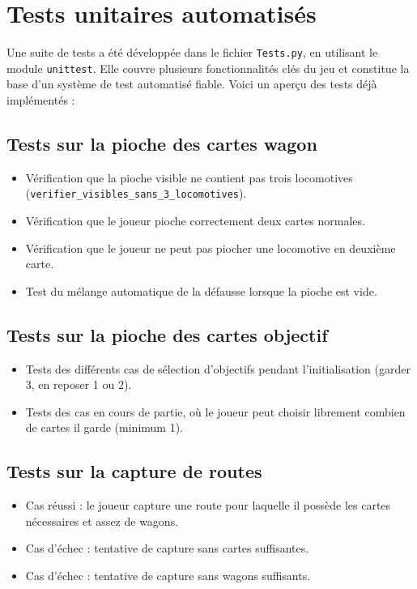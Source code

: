 \documentclass[a4paper,12pt]{report}
\begin{document}
\vspace{1em}
\section{Tests unitaires automatisés}

Une suite de tests a été développée dans le fichier \texttt{Tests.py}, en utilisant le module \texttt{unittest}.
Elle couvre plusieurs fonctionnalités clés du jeu et constitue la base d’un système de test automatisé fiable.
Voici un aperçu des tests déjà implémentés :

\subsection*{Tests sur la pioche des cartes wagon}

\begin{itemize}
    \item Vérification que la pioche visible ne contient pas trois locomotives (\texttt{verifier\_visibles\_sans\_3\_locomotives}).
    \item Vérification que le joueur pioche correctement deux cartes normales.
    \item Vérification que le joueur ne peut pas piocher une locomotive en deuxième carte.
    \item Test du mélange automatique de la défausse lorsque la pioche est vide.
\end{itemize}

\subsection*{Tests sur la pioche des cartes objectif}

\begin{itemize}
    \item Tests des différents cas de sélection d’objectifs pendant l’initialisation (garder 3, en reposer 1 ou 2).
    \item Tests des cas en cours de partie, où le joueur peut choisir librement combien de cartes il garde (minimum 1).
\end{itemize}

\subsection*{Tests sur la capture de routes}

\begin{itemize}
    \item Cas réussi : le joueur capture une route pour laquelle il possède les cartes nécessaires et assez de wagons.
    \item Cas d’échec : tentative de capture sans cartes suffisantes.
    \item Cas d’échec : tentative de capture sans wagons suffisants.
\end{itemize}
\end{document}
